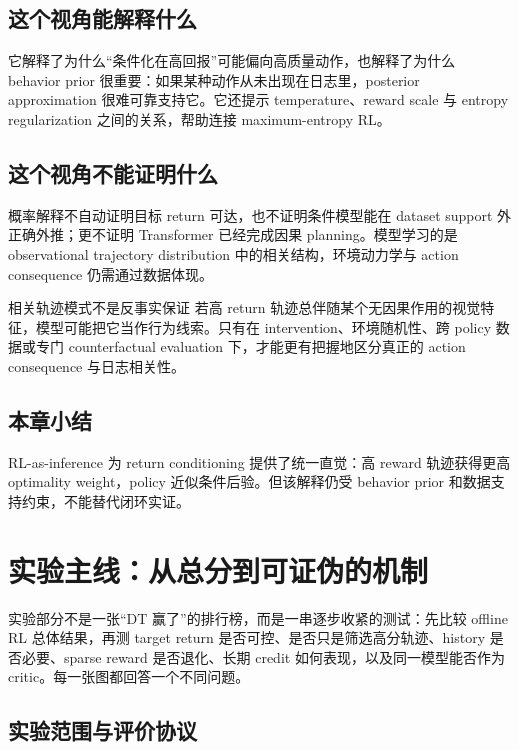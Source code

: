 \documentclass[a4paper]{article}
\begin{document}
\subsection{这个视角能解释什么}

它解释了为什么“条件化在高回报”可能偏向高质量动作，也解释了为什么 behavior prior 很重要：如果某种动作从未出现在日志里，posterior approximation 很难可靠支持它。它还提示 temperature、reward scale 与 entropy regularization 之间的关系，帮助连接 maximum-entropy RL。

\subsection{这个视角不能证明什么}

概率解释不自动证明目标 return 可达，也不证明条件模型能在 dataset support 外正确外推；更不证明 Transformer 已经完成因果 planning。模型学习的是 observational trajectory distribution 中的相关结构，环境动力学与 action consequence 仍需通过数据体现。

\begin{warningbox}{相关轨迹模式不是反事实保证}
若高 return 轨迹总伴随某个无因果作用的视觉特征，模型可能把它当作行为线索。只有在 intervention、环境随机性、跨 policy 数据或专门 counterfactual evaluation 下，才能更有把握地区分真正的 action consequence 与日志相关性。
\end{warningbox}

\subsection{本章小结}

RL-as-inference 为 return conditioning 提供了统一直觉：高 reward 轨迹获得更高 optimality weight，policy 近似条件后验。但该解释仍受 behavior prior 和数据支持约束，不能替代闭环实证。

\section{实验主线：从总分到可证伪的机制}

实验部分不是一张“DT 赢了”的排行榜，而是一串逐步收紧的测试：先比较 offline RL 总体结果，再测 target return 是否可控、是否只是筛选高分轨迹、history 是否必要、sparse reward 是否退化、长期 credit 如何表现，以及同一模型能否作为 critic。每一张图都回答一个不同问题。

\subsection{实验范围与评价协议}
\end{document}
